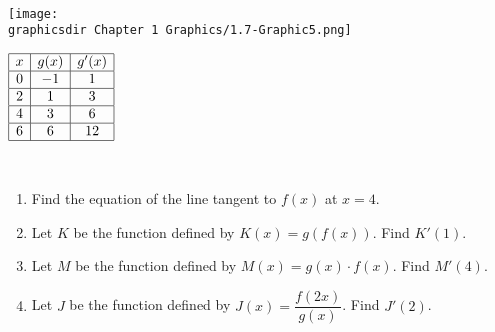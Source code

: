  \\
\begin{minipage}[t]{0.75\textwidth} \vspace{0pt}%
    \texttt{[image: \\graphicsdir Chapter 1 Graphics/1.7-Graphic5.png]}
\end{minipage} \hfill \begin{minipage}[t]{0.2\textwidth} \vspace{11pt}%
    \def\arraystretch{1.4}
    $\begin{array}{|c|c|c|}
        \hline
        x & g(x) & g'(x) \\ \hline
        0 & -1 & 1 \\ \hline
        2 & 1 & 3 \\ \hline
        4 & 3 & 6 \\ \hline
        6 & 6 & 12 \\
        \hline
    \end{array}$
\end{minipage} \\

\begin{enumerate}[label=\hspace{11pt}(\alph*), align=left, leftmargin=*, labelsep=0.25em]
    \item Find the equation of the line tangent to $f(x)$ at $x = 4$.
    \item Let $K$ be the function defined by $K(x) = g(f(x))$. Find $K'(1)$.
    \item Let $M$ be the function defined by $M(x) = g(x) \cdot f(x)$. Find $M'(4)$.
    \item Let $J$ be the function defined by $J(x) = \dfrac{f(2x)}{g(x)}$. Find $J'(2)$.
\end{enumerate} \vspace{11pt}

